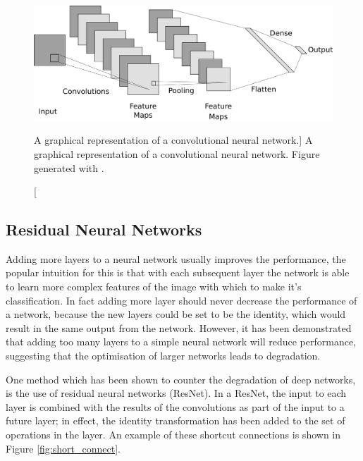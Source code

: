 \begin{figure}

	\centering

	\includegraphics[width = \textwidth]{figures/cnn_layer.png}

	\caption
	[A graphical representation of a convolutional neural network.]
	{ A graphical representation of a convolutional neural network. Figure
	generated with \cite{cnn_diagrams}.}

	\label{fig:cnn_layer}

\end{figure}

\subsection{Residual Neural Networks}
Adding more layers to a neural network usually improves the performance, the
popular intuition for this is that with each subsequent layer the network is
able to learn more complex features of the image with which to make it's
classification. In fact adding more layer should never decrease the 
performance of a network, because the new layers could be set to be the 
identity, which would result in the same output from the network. However, it 
has been demonstrated that adding too many layers to a simple neural network 
will reduce performance, suggesting that the optimisation of
larger networks leads to degradation\cite{He_2016_CVPR}.

One method which has been shown to counter the degradation of deep networks, 
is the use of residual neural networks (ResNet). In a ResNet, the input to 
each layer is combined with the results of the convolutions as part of the 
input to a future layer; in effect, the identity transformation has been added
to the set of operations in the layer. An example of these shortcut connections 
is shown in Figure \ref{fig:short_connect}\cite{He_2016_CVPR}. 

